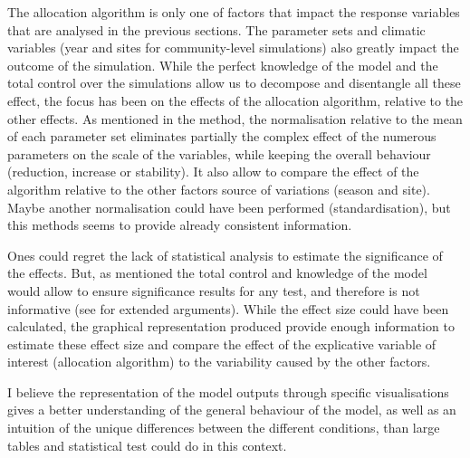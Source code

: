 The allocation algorithm is only one of factors that impact the response variables that are analysed in the previous sections. The parameter sets and climatic variables (year and sites for community-level simulations) also greatly impact the outcome of the simulation. While the perfect knowledge of the model and the total control over the simulations allow us to decompose and disentangle all these effect, the focus has been on the effects of the allocation algorithm, relative to the other effects. As mentioned in the method, the normalisation relative to the mean of each parameter set eliminates partially the complex effect of the numerous parameters on the scale of the variables, while keeping the overall behaviour (reduction, increase or stability). It also allow to compare the effect of the algorithm relative to the other factors source of variations (season and site). Maybe another normalisation could have been performed (standardisation), but this methods seems to provide already consistent information.

Ones could regret the lack of statistical analysis to estimate the significance of the effects. But, as mentioned the total control and knowledge of the model would allow to ensure significance results for any test, and therefore is not informative (see \cite{white_ecologists_2014} for extended arguments). While the effect size could have been calculated, the graphical representation produced provide enough information to estimate these effect size and compare the effect of the explicative variable of interest (allocation algorithm) to the variability caused by the other factors. 

I believe the representation of the model outputs through specific visualisations gives a better understanding of the general behaviour of the model, as well as an intuition of the unique differences between the different conditions, than large tables and statistical test could do in this context. 




